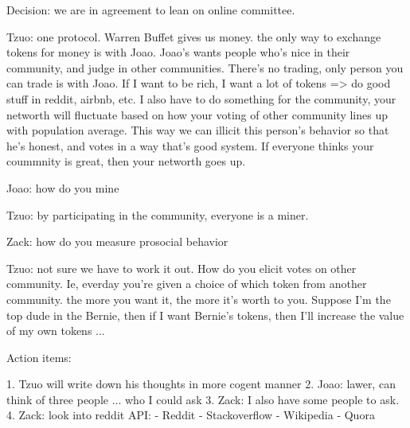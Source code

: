 Decision: we are in agreement to lean on online committee.

Tzuo: one protocol. Warren Buffet gives us money. the only way to exchange tokens for money is with Joao. Joao's wants people who's nice in their community, and judge in other communities. There's no trading, only person you can trade is with Joao. If I want to be rich, I want a lot of tokens => do good stuff in reddit, airbnb, etc. I also have to do something for the community, your networth will fluctuate based on how your voting of other community lines up with population average. This way we can illicit this person's behavior so that he's honest, and votes in a way that's good system. If everyone thinks your coummnity is great, then your networth goes up.  

Joao: how do you mine

Tzuo: by participating in the community, everyone is a miner. 

Zack: how do you measure prosocial behavior

Tzuo: not sure we have to work it out. How do you elicit votes on other community. Ie, everday you're given a choice of which token from another community. the more you want it, the more it's worth to you. Suppose I'm the top dude in the Bernie, then if I want Bernie's tokens, then I'll increase the value of my own tokens ... 

Action items: 

1. Tzuo will write down his thoughts in more cogent manner
2. Joao: lawer, can think of three people ... who I could ask
3. Zack: I also have some people to ask. 
4. Zack: look into reddit API:
	- Reddit
	- Stackoverflow
	- Wikipedia
	- Quora


